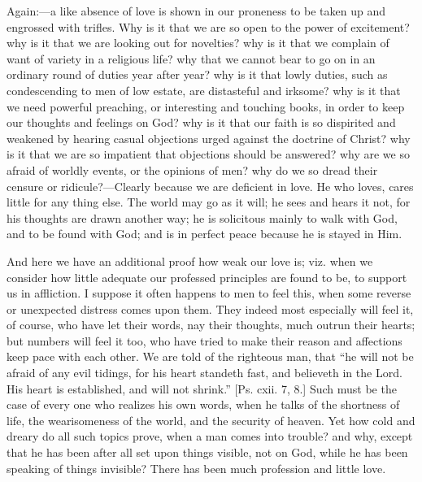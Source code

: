 Again:—a like absence of love is shown in our proneness to be
taken up and engrossed with trifles. Why is it that we are so open to
the power of excitement? why is it that we are looking out for
novelties? why is it that we complain of want of variety in a
religious life? why that we cannot bear to go on in an ordinary round
of duties year after year? why is it that lowly duties, such as
condescending to men of low estate, are distasteful and irksome? why
is it that we need powerful preaching, or interesting and touching
books, in order to keep our thoughts and feelings on God? why is it
that our faith is so dispirited and weakened by hearing casual
objections urged against the doctrine of Christ? why is it that we are
so impatient that objections should be answered? why are we so afraid
of worldly events, or the opinions of men? why do we so dread their
censure or ridicule?—Clearly because we are deficient in love. He
who loves, cares little for any thing else. The world may go as it
will; he sees and hears it not, for his thoughts are drawn another
way; he is solicitous mainly to walk with God, and to be found with
God; and is in perfect peace because he is stayed in Him.

And here we have an additional proof how weak our love is; viz.
when we consider how little adequate our professed principles are
found to be, to support us in affliction. I suppose it often happens
to men to feel this, when some reverse or unexpected distress comes
upon them. They indeed most especially will feel it, of course, who
have let their words, nay their thoughts, much outrun their hearts;
but numbers will feel it too, who have tried to make their reason and
affections keep pace with each other. We are told of the righteous
man, that ``he will not be afraid of any evil tidings, for his
heart standeth fast, and believeth in the Lord. His heart is
established, and will not shrink.'' [Ps. cxii. 7, 8.] Such must be
the case of every one who realizes his own words, when he talks of the
shortness of life, the wearisomeness of the world, and the security of
heaven. Yet how cold and dreary do all such topics prove, when a man
comes into trouble? and why, except that he has been after all set
upon things visible, not on God, while he has been speaking of things
invisible? There has been much profession and little love.

